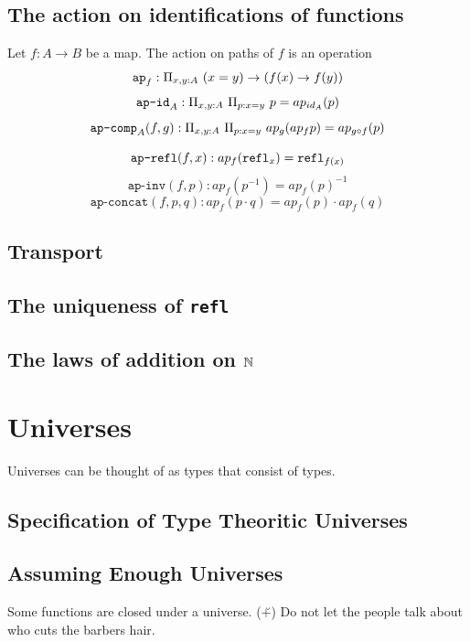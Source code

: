 \documentclass{article}
\begin{document}
\subsection{The action on identifications of functions}
\begin{definition}
  Let $f : A \to B$ be a map. The action on paths of $f$ is an operation
  \[ \texttt{ap}_f : \Pi_{x,y : A}~ {(x = y) \to (f(x) \to f(y))} \]
  \[ \texttt{ap-id}_A : \Pi_{x,y : A}~ {\Pi_{p : x = y}~ {p = ap_{id_A}(p)}} \]
  \[ \texttt{ap-comp}_A (f, g): \Pi_{x,y : A}~ {\Pi_{p : x = y}~ {ap_{g}(ap_{f}p) = ap_{g\circ f}(p)}} \]
\end{definition}
\begin{definition}
  \[\texttt{ap-refl}(f, x) : ap_f (\texttt{refl}_{x}) = \texttt{refl}_{f(x)}\]
  \[\texttt{ap-inv}(f, p) : ap_f(p^{-1}) = ap_f (p)^{-1}\]
  \[\texttt{ap-concat}(f, p, q) : ap_f (p \cdot q) = ap_f (p) \cdot ap_f (q) \]
\end{definition}

\subsection{Transport}

\subsection{The uniqueness of \texttt{refl}}

\subsection{The laws of addition on $\mathbb{N}$}

\section{Universes}
Universes can be thought of as types that consist of types.
\subsection{Specification of Type Theoritic Universes}

\subsection{Assuming Enough Universes}
Some functions are closed under a universe. (\u+)
Do not let the people talk about who cuts the barbers hair.
\end{document}
